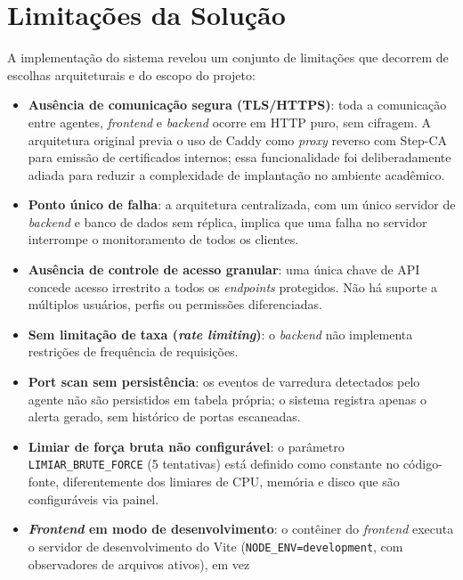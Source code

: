 \documentclass[
    12pt
    ,oneside
    ,a4paper
    ,chapter=TITLE
    ,section=TITLE
    ,sumario=abnt-6027-2012]{abntex2}
\begin{document}
\section{Limitações da Solução}
\label{sec:limitacoes}

A implementação do sistema revelou um conjunto de limitações que decorrem de escolhas
arquiteturais e do escopo do projeto:

\begin{itemize}
    \item \textbf{Ausência de comunicação segura (TLS/HTTPS)}: toda a comunicação
          entre agentes, \textit{frontend} e \textit{backend} ocorre em HTTP puro,
          sem cifragem. A arquitetura original previa o uso de Caddy como
          \textit{proxy} reverso com Step-CA para emissão de certificados internos;
          essa funcionalidade foi deliberadamente adiada para reduzir a complexidade
          de implantação no ambiente acadêmico.
    \item \textbf{Ponto único de falha}: a arquitetura centralizada, com um único
          servidor de \textit{backend} e banco de dados sem réplica, implica que uma
          falha no servidor interrompe o monitoramento de todos os clientes.
    \item \textbf{Ausência de controle de acesso granular}: uma única chave de API
          concede acesso irrestrito a todos os \textit{endpoints} protegidos. Não
          há suporte a múltiplos usuários, perfis ou permissões diferenciadas.
    \item \textbf{Sem limitação de taxa (\textit{rate limiting})}: o \textit{backend}
          não implementa restrições de frequência de requisições.
    \item \textbf{Port scan sem persistência}: os eventos de varredura detectados pelo
          agente não são persistidos em tabela própria; o sistema registra apenas o
          alerta gerado, sem histórico de portas escaneadas.
    \item \textbf{Limiar de força bruta não configurável}: o parâmetro
          \texttt{LIMIAR\_BRUTE\_FORCE} (5 tentativas) está definido como constante
          no código-fonte, diferentemente dos limiares de CPU, memória e disco que são
          configuráveis via painel.
    \item \textbf{\textit{Frontend} em modo de desenvolvimento}: o contêiner do
          \textit{frontend} executa o servidor de desenvolvimento do Vite
          (\texttt{NODE\_ENV=development}, com observadores de arquivos ativos), em vez

\end{itemize}
\end{document}
